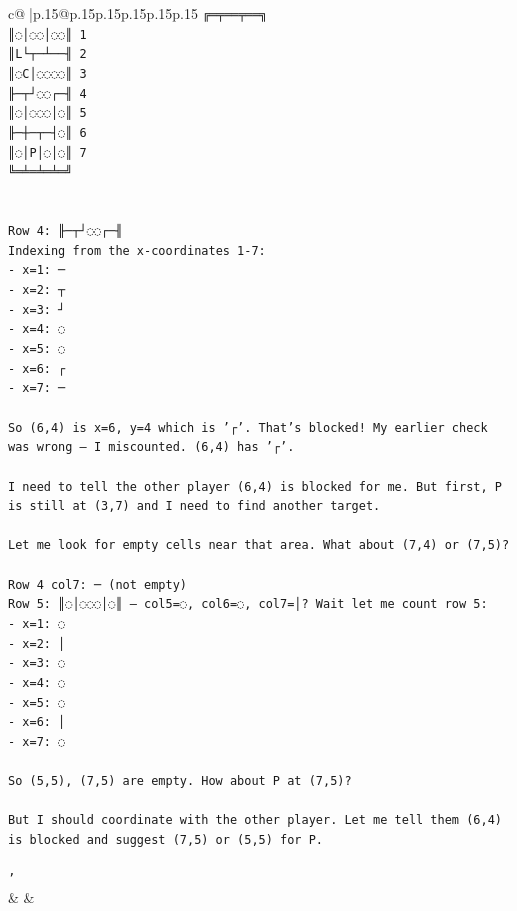 \documentclass{article}
\begin{document}
{\begin{supertabular}{c@{$\;$}|p{.15\linewidth}@{}p{.15\linewidth}p{.15\linewidth}p{.15\linewidth}p{.15\linewidth}p{.15\linewidth}}
{{{\texttt{╔═╤══╤══╗} \\
\texttt{║◌│◌◌│◌◌║ 1} \\
\texttt{║L└┬─┴──╢ 2} \\
\texttt{║◌C│◌◌◌◌║ 3} \\
\texttt{╟─┬┘◌◌┌─╢ 4} \\
\texttt{║◌│◌◌◌│◌║ 5} \\
\texttt{╟─┼─┬─┤◌║ 6} \\
\texttt{║◌│P│◌│◌║ 7} \\
\texttt{╚═╧═╧═╧═╝} \\
\\ 
\\ 
\texttt{Row 4: ╟─┬┘◌◌┌─╢} \\
\texttt{Indexing from the x{-}coordinates 1{-}7:} \\
\texttt{{-} x=1: ─} \\
\texttt{{-} x=2: ┬} \\
\texttt{{-} x=3: ┘} \\
\texttt{{-} x=4: ◌} \\
\texttt{{-} x=5: ◌} \\
\texttt{{-} x=6: ┌} \\
\texttt{{-} x=7: ─} \\
\\ 
\texttt{So (6,4) is x=6, y=4 which is '┌'. That's blocked! My earlier check was wrong — I miscounted. (6,4) has '┌'.} \\
\\ 
\texttt{I need to tell the other player (6,4) is blocked for me. But first, P is still at (3,7) and I need to find another target.} \\
\\ 
\texttt{Let me look for empty cells near that area. What about (7,4) or (7,5)?} \\
\\ 
\texttt{Row 4 col7: ─ (not empty)} \\
\texttt{Row 5: ║◌│◌◌◌│◌║ — col5=◌, col6=◌, col7=│? Wait let me count row 5:} \\
\texttt{{-} x=1: ◌} \\
\texttt{{-} x=2: │} \\
\texttt{{-} x=3: ◌} \\
\texttt{{-} x=4: ◌} \\
\texttt{{-} x=5: ◌} \\
\texttt{{-} x=6: │} \\
\texttt{{-} x=7: ◌} \\
\\ 
\texttt{So (5,5), (7,5) are empty. How about P at (7,5)?} \\
\\ 
\texttt{But I should coordinate with the other player. Let me tell them (6,4) is blocked and suggest (7,5) or (5,5) for P.} \\
\\ 
\texttt{'} \\
            }
        }
    }
    & & \\ \\


\end{supertabular}}
\end{document}
